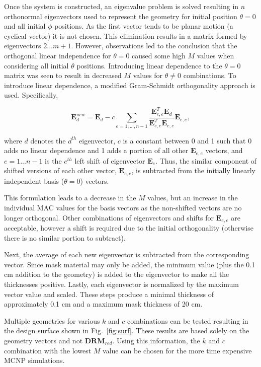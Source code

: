 \documentclass[3p,times]{elsarticle}
\begin{document}
Once the system is constructed, an eigenvalue problem is solved resulting in $n$ orthonormal eigenvectors used to represent the geometry for initial position $\theta=0$ and all initial $\phi$ positions.  
As the first vector tends to be planar motion (a cyclical vector) it is not chosen.  
This elimination results in a matrix formed by eigenvectors $2...m+1$.  
However, observations led to the conclusion that the orthogonal linear independence for $\theta=0$ caused some high $M$ values when considering all initial $\theta$ positions.  
Introducing linear dependence to the $\theta=0$ matrix was seen to result in decreased $M$ values for $\theta\neq 0$ combinations.  
To introduce linear dependence, a modified Gram-Schmidt orthogonality approach is used.  Specifically, 

\begin{equation}
\mathbf{E}^{new}_{d}=\mathbf{E}_{d}- c \sum_{e=1,...,n-1} \frac{\mathbf{E}_{e,e}^T \mathbf{E}_{d}}{\mathbf{E}_{e,e}^T \mathbf{E}_{e,e}}\mathbf{E}_{e,e},
\label{eq:GS}
\end{equation}

\noindent where $d$ denotes the $d^{th}$ eigenvector, $c$ is a constant between 0 and 1 such that 0 adds no linear dependence and 1 adds a portion of all other $\mathbf{E}_{e,e}$ vectors, and $e=1...n-1$ is the $e^{th}$ left shift of eigenvector $\mathbf{E}_e$. 
Thus, the similar component of shifted versions of each other vector, $\mathbf{E}_{e,e}$, is subtracted from the initially linearly independent basis ($\theta=0$) vectors. 

This formulation leads to a decrease in the $M$ values, but an increase in the individual MAC values for the basis vectors as the non-shifted vectors are no longer orthogonal.
Other combinations of eigenvectors and shifts for $\mathbf{E}_{e,e}$ are acceptable, however a shift is required due to the initial orthogonality (otherwise there is no similar portion to subtract).

Next, the average of each new eigenvector is subtracted from the corresponding vector. 
Since mask material may only be added, the minimum value (plus the 0.1 cm addition to the geometry) is added to the eigenvector to make all the thicknesses positive.  
Lastly, each eigenvector is normalized by the maximum vector value and scaled. 
These steps produce a minimal thickness of approximately 0.1 cm and a maximum mask thickness of 20 cm.

Multiple geometries for various $k$ and $c$ combinations can be tested resulting in the design surface shown in Fig.~\ref{fig:surf}.  
These results are based solely on the geometry vectors and not $\mathbf{DRM}_{red}$.  
Using this information, the $k$ and $c$ combination with the lowest $M$ value can be chosen for the more time expensive MCNP simulations.
\end{document}
